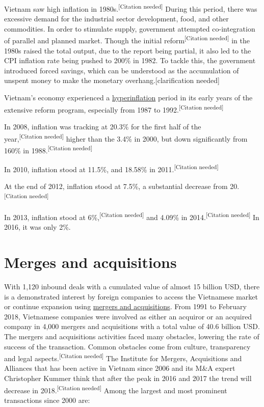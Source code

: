 \documentclass[openany]{book}
\begin{document}
Vietnam saw high inflation in 1980s.\textsuperscript{[Citation needed]} During this period, there was excessive demand for the industrial sector development, food, and other commodities. In order to stimulate supply, government attempted co-integration of parallel and planned market. Though the initial reform\textsuperscript{[Citation needed]} in the 1980s raised the total output, due to the report being partial, it also led to the CPI inflation rate being pushed to 200\% in 1982. To tackle this, the government introduced forced savings, which can be understood as the accumulation of unspent money to make the monetary overhang.[clarification needed]

Vietnam's economy experienced a \href{https://en.wikipedia.org/wiki/Hyperinflation}{hyperinflation} period in its early years of the extensive reform program, especially from 1987 to 1992.\textsuperscript{[Citation needed]}

In 2008, inflation was tracking at 20.3\% for the first half of the \\year,\textsuperscript{[Citation needed]} higher than the 3.4\% in 2000, but down significantly from 160\% in 1988.\textsuperscript{[Citation needed]}

In 2010, inflation stood at 11.5\%, and 18.58\% in 2011.\textsuperscript{[Citation needed]}

At the end of 2012, inflation stood at 7.5\%, a substantial decrease from 20.\textsuperscript{[Citation needed]}

In 2013, inflation stood at 6\%,\textsuperscript{[Citation needed]} and 4.09\% in 2014.\textsuperscript{[Citation needed]} In 2016, it was only 2\%.

\chapter{Merges and acquisitions}

With 1,120 inbound deals with a cumulated value of almost 15 billion USD, there is a demonstrated interest by foreign companies to access the Vietnamese market or continue expansion using \href{https://en.wikipedia.org/wiki/Mergers_and_acquisitions}{mergers and acquisitions}. From 1991 to February 2018, Vietnamese companies were involved as either an acquiror or an acquired company in 4,000 mergers and acquisitions with a total value of 40.6 billion USD. The mergers and acquisitions activities faced many obstacles, lowering the rate of success of the transaction. Common obstacles come from culture, transparency and legal aspects.\textsuperscript{[Citation needed]} The Institute for Mergers, Acquisitions and Alliances that has been active in Vietnam since 2006 and its M\&A expert Christopher Kummer think that after the peak in 2016 and 2017 the trend will decrease in 2018.\textsuperscript{[Citation needed]} Among the largest and most prominent transactions since 2000 are:
\end{document}
